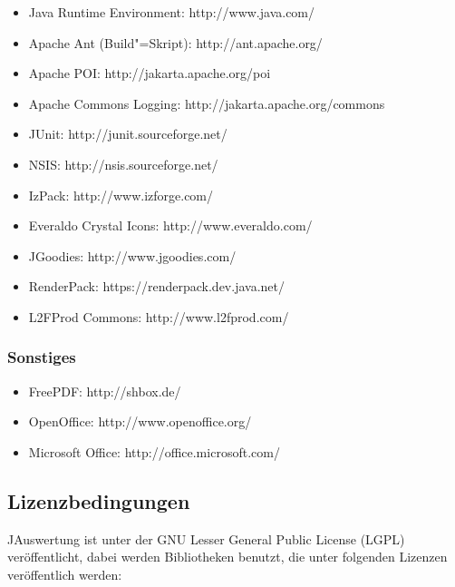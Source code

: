 \documentclass[11pt,a4paper,twoside,ngerman]{article}
\begin{document}
\begin{itemize}

\item Java Runtime Environment: http://www.java.com/


\item Apache Ant (Build"=Skript): http://ant.apache.org/


\item Apache POI: http://jakarta.apache.org/poi


\item Apache Commons Logging: http://jakarta.apache.org/commons


\item JUnit: http://junit.sourceforge.net/


\item NSIS: http://nsis.sourceforge.net/


\item IzPack: http://www.izforge.com/


\item Everaldo Crystal Icons: http://www.everaldo.com/


\item JGoodies: http://www.jgoodies.com/


\item RenderPack: https://renderpack.dev.java.net/


\item L2FProd Commons: http://www.l2fprod.com/


\end{itemize}

\subsubsection*{Sonstiges}

\begin{itemize}

\item FreePDF: http://shbox.de/


\item OpenOffice: http://www.openoffice.org/


\item Microsoft Office: http://office.microsoft.com/


\end{itemize}

\newpage

\subsection{Lizenzbedingungen}
JAuswertung ist unter der GNU Lesser General Public License (LGPL) veröffentlicht, dabei werden Bibliotheken benutzt, die unter folgenden Lizenzen veröffentlich werden:
\end{document}
